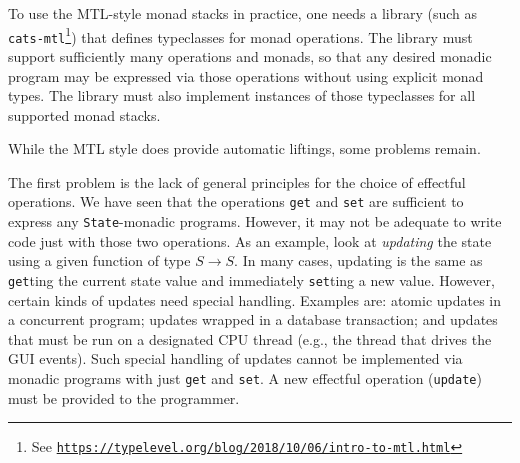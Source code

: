 To use the MTL-style monad stacks in practice, one needs a library
(such as \texttt{cats-mtl}\footnote{See \texttt{\href{https://typelevel.org/blog/2018/10/06/intro-to-mtl.html}{https://typelevel.org/blog/2018/10/06/intro-to-mtl.html}}})
that defines typeclasses for monad operations. The library must support
sufficiently many operations and monads, so that any desired monadic
program may be expressed via those operations without using explicit
monad types. The library must also implement instances of those typeclasses
for all supported monad stacks. 

While the MTL style does provide automatic liftings, some problems
remain. 

The first problem is the lack of general principles for the choice
of effectful operations. We have seen that the operations \lstinline!get!
and \lstinline!set! are sufficient to express any \lstinline!State!-monadic
programs. However, it may not be adequate to write code just with
those two operations. As an example, look at \emph{updating} the state
using a given function of type $S\rightarrow S$. In many cases, updating
is the same as \lstinline!get!ting the current state value and immediately
\lstinline!set!ting a new value. However, certain kinds of updates
need special handling. Examples are: atomic updates in a concurrent
program; updates wrapped in a database transaction; and updates that
must be run on a designated CPU thread (e.g., the thread that drives
the GUI events). Such special handling of updates cannot be implemented
via monadic programs with just \lstinline!get! and \lstinline!set!.
A new effectful operation (\lstinline!update!) must be provided to
the programmer.

